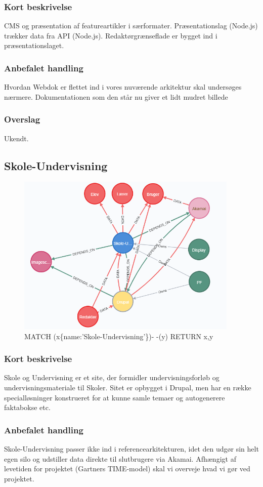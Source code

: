 \documentclass{article}
\begin{document}
\subsubsection{Kort beskrivelse}
CMS og præsentation af featureartikler i særformater.	
Præsentationslag (Node.js) trækker data fra API (Node.js). Redaktørgrænseflade er bygget ind i præsentationslaget.
\subsubsection{Anbefalet handling}
Hvordan Webdok er flettet ind i vores nuværende arkitektur skal undersøges nærmere. Dokumentationen som den står nu giver et lidt mudret billede
\subsubsection{Overslag}
Ukendt.


\subsection{Skole-Undervisning}
\begin{figure}[h]
\includegraphics[width=300pt]{Skole-Undervisning.PNG}
\caption{MATCH (x\{name:'Skole-Undervisning'\})- -(y) RETURN x,y}
\end{figure}
\subsubsection{Kort beskrivelse}
Skole og Undervisning er et site, der formidler undervisningsforløb og undervisningsmateriale til Skoler.  Sitet er opbygget i Drupal, men har en række specialløsninger konstrueret for at kunne samle temaer og autogenerere faktabokse etc. 
\subsubsection{Anbefalet handling}
Skole-Undervisning passer ikke ind i referencearkitekturen, idet den udgør sin helt egen silo og udstiller data direkte til slutbrugere via Akamai. 
Afhængigt af levetiden for projektet (Gartners TIME-model) skal vi overveje hvad vi gør ved projektet.
\end{document}
